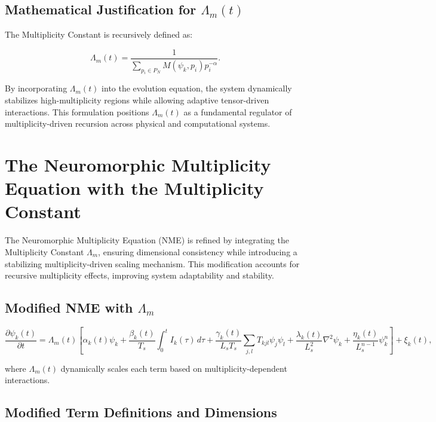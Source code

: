\documentclass{article}
\theoremstyle{plain}
\begin{document}
\subsection{Mathematical Justification for \( \Lambda_m(t) \)}

The Multiplicity Constant is recursively defined as:

\begin{equation}
\Lambda_m(t) = \frac{1}{\sum_{p_i \in P_N} M(\psi_k, p_i) p_i^{-\alpha}}.
\end{equation}

By incorporating \( \Lambda_m(t) \) into the evolution equation, the system dynamically stabilizes high-multiplicity regions while allowing adaptive tensor-driven interactions. This formulation positions \( \Lambda_m(t) \) as a fundamental regulator of multiplicity-driven recursion across physical and computational systems.

\section{The Neuromorphic Multiplicity Equation with the Multiplicity Constant}

The Neuromorphic Multiplicity Equation (NME) is refined by integrating the Multiplicity Constant \( \Lambda_m \), ensuring dimensional consistency while introducing a stabilizing multiplicity-driven scaling mechanism. This modification accounts for recursive multiplicity effects, improving system adaptability and stability.

\subsection{Modified NME with \( \Lambda_m \)}

\begin{equation}
\frac{\partial \psi_k(t)}{\partial t} = \Lambda_m(t) \left[ \alpha_k(t) \psi_k + \frac{\beta_k(t)}{T_s} \int_0^t I_k(\tau) \, d\tau + \frac{\gamma_k(t)}{L_s T_s} \sum_{j,l} T_{kjl} \psi_j \psi_l + \frac{\lambda_k(t)}{L_s^2} \nabla^2 \psi_k + \frac{\eta_k(t)}{L_s^{n-1}} \psi_k^n \right] + \xi_k(t),
\end{equation}

where \( \Lambda_m(t) \) dynamically scales each term based on multiplicity-dependent interactions.

\subsection{Modified Term Definitions and Dimensions}
\end{document}
